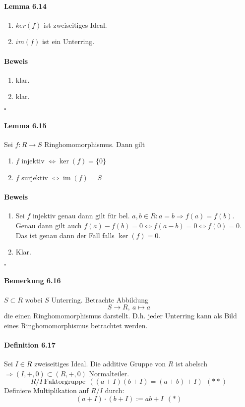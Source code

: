 \documentclass{scrartcl}
\newcommand{\im}{\operatorname{im}}
\begin{document}
\paragraph{Lemma 6.14}
\begin{enumerate}
\item $ker(f)$ ist zweiseitiges Ideal.
\item $im(f)$ ist ein Unterring.
\end{enumerate}
\paragraph{Beweis}
\begin{enumerate}{}
\item klar.
\item klar.
\end{enumerate}
\hfill $\square$


\paragraph{Lemma 6.15}
Sei $f: R \to S$ Ringhomomorphismus. Dann gilt
\begin{enumerate}
\item $f$ injektiv $\Leftrightarrow \ker(f) = \{0\}$
\item $f$ surjektiv $\Leftrightarrow \im(f) = S$
\end{enumerate}
\paragraph{Beweis}
\begin{enumerate}{}
\item Sei $f$ injektiv genau dann gilt für bel. $a,b \in R: a = b \Rightarrow f(a) = f(b)$.
  Genau dann gilt auch $f(a) - f(b) = 0 \iff f(a - b) = 0 \iff f(0) = 0$. Das
  ist genau dann der Fall falls $\ker(f)=0$.
\item Klar.
\end{enumerate}
\hfill $\square$


\paragraph{Bemerkung 6.16}
$S \subset R$ wobei $S$ Unterring. Betrachte Abbildung
\[
  S \to R,~a \mapsto a
\]
die einen Ringhomomorphismus darstellt. D.h. jeder Unterring kann als Bild eines
Ringhomomorphismus betrachtet werden.

\paragraph{Definition 6.17}
Sei $I \in R$ zweiseitiges Ideal. Die additive Gruppe von $R$ ist abelsch
$\Rightarrow (I, +, 0) \subset (R, +, 0)$ Normalteiler.
\[
  R/I ~\text{Faktorgruppe}~~((a+I)(b+I) = (a+b) + I) ~~(**)
\]
Definiere Multiplikation auf $R/I$ durch:
\[
  (a + I) \cdot (b + I) := ab + I ~~(*)
\]
\end{document}

